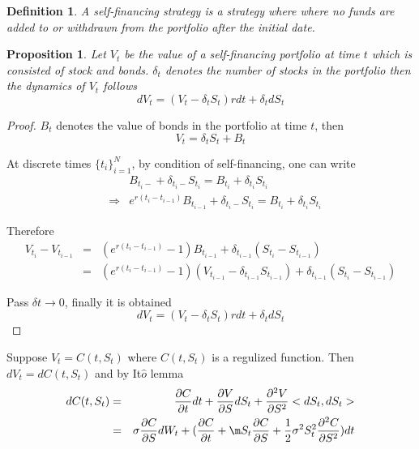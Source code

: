 \documentclass[10pt]{article}
\theoremstyle{plain}
\newtheorem{definition}{Definition}[section]
\newtheorem{prop}{Proposition}[section]
\numberwithin{equation}{section}
\numberwithin{table}{section}
\newcommand{\s}{\sigma}
\newcommand{\prt}[1]{\left( #1 \right)}  %
\newcommand{\de}{\delta}
\newcommand{\pa}{\partial}
\begin{document}
\begin{definition}
A self-financing strategy is a strategy where where no funds are added
to or withdrawn from the portfolio after the initial date.
\end{definition}

\begin{prop}
    Let $V_t$ be the value of a self-financing portfolio at time $t$ which is consisted of stock and bonds. $\delta_t$ denotes the number of stocks in the portfolio then
    the dynamics of $V_t$ follows
    \[
        dV_t =  \prt{V_t - \de_t S_t}rdt + \de_tdS_t   
    \]
\end{prop}
\begin{proof}
    $B_t$ denotes the value of bonds in the portfolio at time $t$, then 
    \[
        V_t = \de_t S_t + B_t
    \]

    At discrete times $\{t_i\}_{i=1}^N$, by condition of self-financing, one can write
    \begin{eqnarray*}
        && B_{t_i-} + \de_{t_i-} S_{t_i} =    B_{t_i} + \de_{t_i} S_{t_i}  \\
        &\Rightarrow&  e^{r(t_i-t_{i-1})}B_{t_{i-1}} + \de_{t_i-} S_{t_i} =  B_{t_i} + \de_{t_i} S_{t_i} 
    \end{eqnarray*}

    Therefore
    \begin{eqnarray*}
         V_{t_i} - V_{t_{i-1}} &=& (e^{r(t_i-t_{i-1})}-1)B_{t_{i-1}}   + \de_{t_{i-1}}(S_{t_i}-S_{t_{i-1}}) \\
                               &=&  (e^{r(t_i-t_{i-1})}-1)(V_{t_{i-1}} - \de_{t_{i-1}}S_{t_{i-1}}) + \de_{t_{i-1}}(S_{t_i}-S_{t_{i-1}})
    \end{eqnarray*}

    Pass $\delta t \rightarrow 0$, finally it is obtained
    \[
        dV_t =  \prt{V_t - \de_t S_t}rdt + \de_tdS_t   
    \]

\end{proof}

Suppose $V_t=C(t, S_t)$ where $C(t,S_t)$ is a regulized function. Then $dV_t=dC(t,S_t)$ and by It$\hat{o}$ lemma
\begin{eqnarray*}
    d C(t,S_t) &=& \frac{\pa C}{\pa t} d t + \frac{\pa V}{\pa S} d S_t + \frac{\pa^2 V}{\pa S^2}<dS_t,dS_t>  \\
            &=&\s \frac{\pa C}{\pa S} d W_t + (\frac{\pa C}{\pa t} +\m S_t \frac{\pa C}{\pa S}+\frac{1}{2}\s^2 S_t^2\frac{\pa^2 C}{\pa S^2})dt 
\end{eqnarray*}
\end{document}
